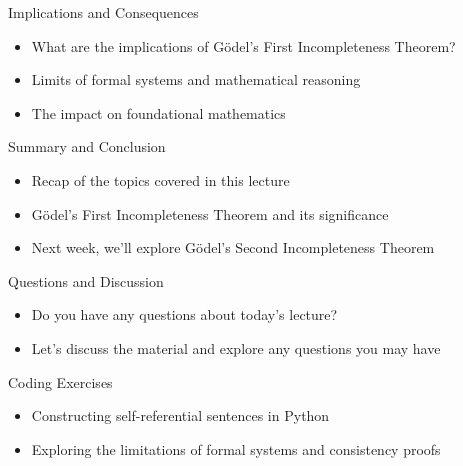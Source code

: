 \documentclass[presentation]{beamer}
\begin{document}
\begin{frame}[label={sec:org1dacc62}]{Implications and Consequences}
\begin{itemize}
\item What are the implications of Gödel's First Incompleteness Theorem?
\item Limits of formal systems and mathematical reasoning
\item The impact on foundational mathematics
\end{itemize}
\end{frame}

\begin{frame}[label={sec:orgdb35fc2}]{Summary and Conclusion}
\begin{itemize}
\item Recap of the topics covered in this lecture
\item Gödel's First Incompleteness Theorem and its significance
\item Next week, we'll explore Gödel's Second Incompleteness Theorem
\end{itemize}
\end{frame}

\begin{frame}[label={sec:orgdd6eae1}]{Questions and Discussion}
\begin{itemize}
\item Do you have any questions about today's lecture?
\item Let's discuss the material and explore any questions you may have
\end{itemize}
\end{frame}

\begin{frame}[label={sec:org0717112}]{Coding Exercises}
\begin{itemize}
\item Constructing self-referential sentences in Python
\item Exploring the limitations of formal systems and consistency proofs
\end{itemize}
\end{frame}
\end{document}
